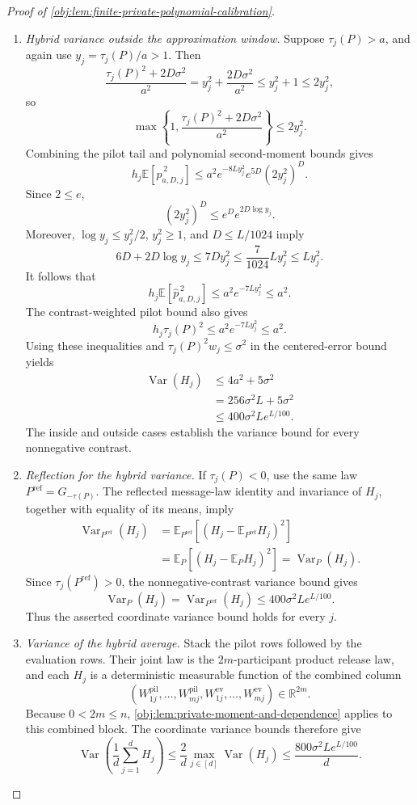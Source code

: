 \documentclass[11pt]{article}
\begin{document}
\begin{proof}[Proof of \cref{obj:lem:finite-private-polynomial-calibration}]
\begin{enumerate}
\item \textit{Hybrid variance outside the approximation window.}
Suppose \(\tau_j(P)>a\), and again use \(y_j=\tau_j(P)/a>1\). Then
\[
\frac{\tau_j(P)^2+2D\sigma^2}{a^2}
=y_j^2+\frac{2D\sigma^2}{a^2}
\le y_j^2+1
\le2y_j^2,
\]
so
\[
\max\left\{1,\frac{\tau_j(P)^2+2D\sigma^2}{a^2}\right\}
\le2y_j^2.
\]
Combining the pilot tail and polynomial second-moment bounds gives
\[
h_j\mathbb E[\widehat p_{a,D,j}^{\,2}]
\le a^2e^{-8Ly_j^2}e^{5D}(2y_j^2)^D.
\]
Since \(2\le e\),
\[
(2y_j^2)^D\le e^D e^{2D\log y_j}.
\]
Moreover, \(\log y_j\le y_j^2/2\), \(y_j^2\ge1\), and \(D\le L/1024\) imply
\[
6D+2D\log y_j
\le7Dy_j^2
\le\frac7{1024}Ly_j^2
\le Ly_j^2.
\]
It follows that
\[
h_j\mathbb E[\widehat p_{a,D,j}^{\,2}]
\le a^2e^{-7Ly_j^2}\le a^2.
\]
The contrast-weighted pilot bound also gives
\[
h_j\tau_j(P)^2\le a^2e^{-7Ly_j^2}\le a^2.
\]
Using these inequalities and \(\tau_j(P)^2w_j\le\sigma^2\) in the centered-error bound yields
\[
\begin{aligned}
\operatorname{Var}(H_j)
&\le4a^2+5\sigma^2\\
&=256\sigma^2L+5\sigma^2\\
&\le400\sigma^2Le^{L/100}.
\end{aligned}
\]
The inside and outside cases establish the variance bound for every nonnegative contrast.

\item \textit{Reflection for the hybrid variance.}
If \(\tau_j(P)<0\), use the same law \(P^{\mathrm{ref}}=G_{-\tau(P)}\). The reflected message-law identity and invariance of \(H_j\), together with equality of its means, imply
\[
\begin{aligned}
\operatorname{Var}_{P^{\mathrm{ref}}}(H_j)
&=\mathbb E_{P^{\mathrm{ref}}}
       [(H_j-\mathbb E_{P^{\mathrm{ref}}}H_j)^2]\\
&=\mathbb E_P[(H_j-\mathbb E_PH_j)^2]
=\operatorname{Var}_P(H_j).
\end{aligned}
\]
Since \(\tau_j(P^{\mathrm{ref}})>0\), the nonnegative-contrast variance bound gives
\[
\operatorname{Var}_P(H_j)
=\operatorname{Var}_{P^{\mathrm{ref}}}(H_j)
\le400\sigma^2Le^{L/100}.
\]
Thus the asserted coordinate variance bound holds for every \(j\).

\item \textit{Variance of the hybrid average.}
Stack the pilot rows followed by the evaluation rows. Their joint law is the \(2m\)-participant product release law, and each \(H_j\) is a deterministic measurable function of the combined column
\[
(W^{\mathrm{pil}}_{1j},\ldots,W^{\mathrm{pil}}_{mj},
 W^{\mathrm{ev}}_{1j},\ldots,W^{\mathrm{ev}}_{mj})
\in\mathbb R^{2m}.
\]
Because \(0<2m\le n\), \cref{obj:lem:private-moment-and-dependence} applies to this combined block. The coordinate variance bounds therefore give
\[
\operatorname{Var}\left(\frac1d\sum_{j=1}^dH_j\right)
\le\frac2d\max_{j\in[d]}\operatorname{Var}(H_j)
\le\frac{800\sigma^2Le^{L/100}}d.
\]


\end{enumerate}
\end{proof}
\end{document}

